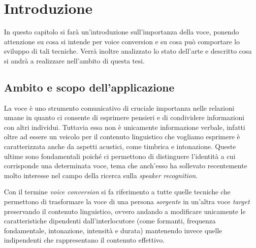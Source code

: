 \chapter{Introduzione}
		In questo capitolo si farà un'introduzione sull'importanza della voce, ponendo attenzione su cosa si intende per voice conversion e su cosa può comportare lo sviluppo di tali tecniche. Verrà inoltre analizzato lo stato dell'arte e descritto cosa si andrà a realizzare nell'ambito di questa tesi.
	
		\section{Ambito e scopo dell'applicazione}
			La voce è uno strumento comunicativo di cruciale importanza nelle relazioni umane in quanto ci consente di esprimere pensieri e di condividere informazioni con altri individui. Tuttavia essa non è unicamente informazione verbale, infatti oltre ad essere un veicolo per il contenuto linguistico che vogliamo esprimere è caratterizzata anche da aspetti acustici, come timbrica e intonazione.
			Queste ultime sono fondamentali poiché ci permettono di distinguere l’identità a cui corrisponde una determinata voce, tema che anch'esso ha sollevato recentemente molto interesse nel campo della ricerca sulla \textit{speaker recognition}\cite{speaker-recognition}.
			
			Con il termine \textit{voice conversion} si fa riferimento a tutte quelle tecniche che permettono di trasformare la voce di una persona \textit{sorgente} in un’altra voce \textit{target} preservando il contenuto linguistico, ovvero andando a modificare unicamente le caratteristiche dipendenti dall'interlocutore (come formanti, frequenza fondamentale, intonazione, intensità e durata) mantenendo invece quelle indipendenti che rappresentano il contenuto effettivo.
			
